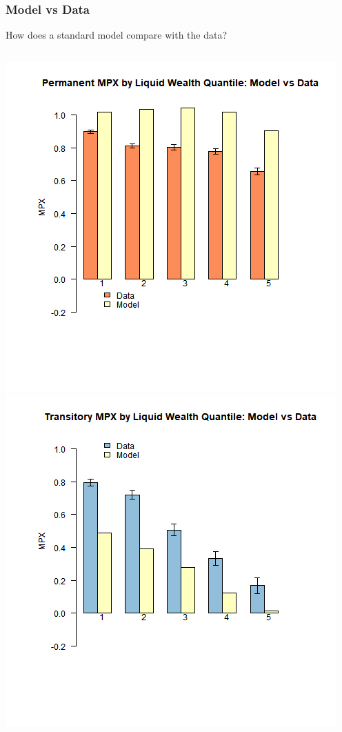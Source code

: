 \documentclass{beamer}
\begin{document}
\frame
{
	\frametitle{Model vs Data}
	How does a standard model compare with the data?
	\begin{columns}
		\centering
		\includegraphics[scale=0.35]{../Figures/CSTW_perm_denmark.png}
		\centering
		\includegraphics[scale=0.35]{../Figures/CSTW_tran_denmark.png}
	\end{columns} 
}
\end{document}
